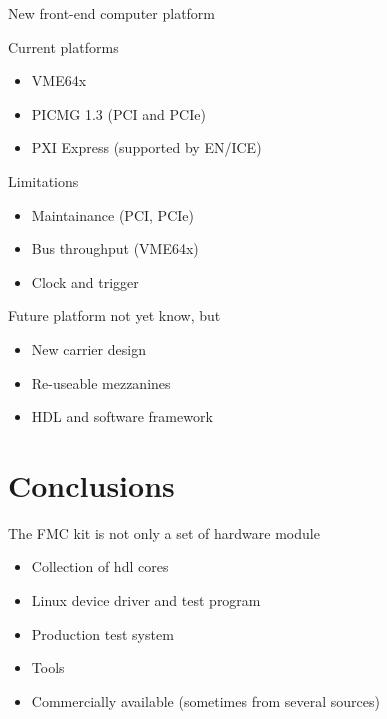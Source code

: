 \documentclass[compress,red]{beamer}
\begin{document}
\begin{frame}{New front-end computer platform}

  \begin{block}{Current platforms}
    \begin{itemize}
    \item VME64x
    \item PICMG 1.3 (PCI and PCIe)
    \item PXI Express (supported by EN/ICE)
    \end{itemize}
  \end{block}

  \begin{block}{Limitations}
    \begin{itemize}
    \item Maintainance (PCI, PCIe)
    \item Bus throughput (VME64x)
    \item Clock and trigger
    \end{itemize}
  \end{block}

  \begin{block}{Future platform not yet know, but}
    \begin{itemize}
    \item New carrier design
    \item Re-useable mezzanines
    \item HDL and software framework
    \end{itemize}
  \end{block}

\end{frame}


\section{Conclusions}

\begin{frame}{}

  \begin{block}{The FMC kit is not only a set of hardware module}
    \begin{itemize}
    \item Collection of hdl cores
    \item Linux device driver and test program
    \item Production test system
    \item Tools %
    \item Commercially available (sometimes from several sources)
    \end{itemize}
  \end{block}

\end{frame}
\end{document}
